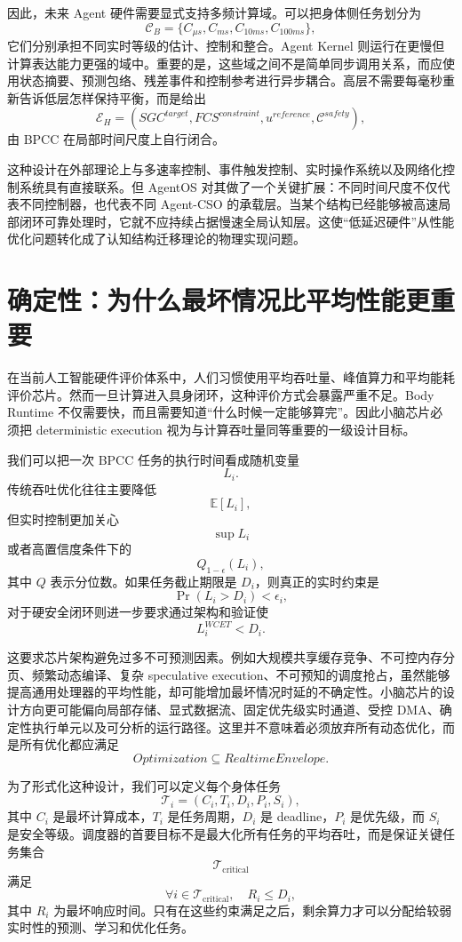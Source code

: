 因此，未来 Agent 硬件需要显式支持多频计算域。可以把身体侧任务划分为
\[
\mathcal C_B
=
\{
C_{\mu s},
C_{ms},
C_{10ms},
C_{100ms}
\},
\]
它们分别承担不同实时等级的估计、控制和整合。Agent Kernel 则运行在更慢但计算表达能力更强的域中。重要的是，这些域之间不是简单同步调用关系，而应使用状态摘要、预测包络、残差事件和控制参考进行异步耦合。高层不需要每毫秒重新告诉低层怎样保持平衡，而是给出
\[
\mathcal E_H
=
(
SGC^{target},
FCS^{constraint},
u^{reference},
\mathcal C^{safety}
),
\]
由 BPCC 在局部时间尺度上自行闭合。

这种设计在外部理论上与多速率控制、事件触发控制、实时操作系统以及网络化控制系统具有直接联系。但 AgentOS 对其做了一个关键扩展：不同时间尺度不仅代表不同控制器，也代表不同 Agent-CSO 的承载层。当某个结构已经能够被高速局部闭环可靠处理时，它就不应持续占据慢速全局认知层。这使“低延迟硬件”从性能优化问题转化成了认知结构迁移理论的物理实现问题。

\section{确定性：为什么最坏情况比平均性能更重要}

在当前人工智能硬件评价体系中，人们习惯使用平均吞吐量、峰值算力和平均能耗评价芯片。然而一旦计算进入具身闭环，这种评价方式会暴露严重不足。Body Runtime 不仅需要快，而且需要知道“什么时候一定能够算完”。因此小脑芯片必须把 deterministic execution 视为与计算吞吐量同等重要的一级设计目标。

我们可以把一次 BPCC 任务的执行时间看成随机变量
\[
L_i.
\]
传统吞吐优化往往主要降低
\[
\mathbb E[L_i],
\]
但实时控制更加关心
\[
\sup L_i
\]
或者高置信度条件下的
\[
Q_{1-\epsilon}(L_i),
\]
其中 $Q$ 表示分位数。如果任务截止期限是 $D_i$，则真正的实时约束是
\[
\Pr(L_i>D_i)
<
\epsilon_i,
\]
对于硬安全闭环则进一步要求通过架构和验证使
\[
L_i^{WCET}
<
D_i.
\]

这要求芯片架构避免过多不可预测因素。例如大规模共享缓存竞争、不可控内存分页、频繁动态编译、复杂 speculative execution、不可预知的调度抢占，虽然能够提高通用处理器的平均性能，却可能增加最坏情况时延的不确定性。小脑芯片的设计方向更可能偏向局部存储、显式数据流、固定优先级实时通道、受控 DMA、确定性执行单元以及可分析的运行路径。这里并不意味着必须放弃所有动态优化，而是所有优化都应满足
\[
Optimization
\subseteq
RealtimeEnvelope.
\]

为了形式化这种设计，我们可以定义每个身体任务
\[
\mathcal T_i
=
(C_i,T_i,D_i,P_i,S_i),
\]
其中 $C_i$ 是最坏计算成本，$T_i$ 是任务周期，$D_i$ 是 deadline，$P_i$ 是优先级，而 $S_i$ 是安全等级。调度器的首要目标不是最大化所有任务的平均吞吐，而是保证关键任务集合
\[
\mathcal T_{\mathrm{critical}}
\]
满足
\[
\forall i\in\mathcal T_{\mathrm{critical}},
\quad
R_i\leq D_i,
\]
其中 $R_i$ 为最坏响应时间。只有在这些约束满足之后，剩余算力才可以分配给较弱实时性的预测、学习和优化任务。

